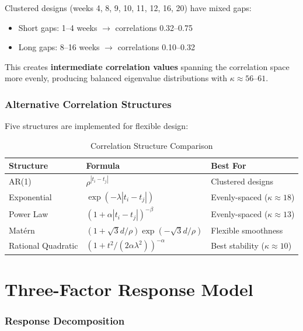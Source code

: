 \documentclass[11pt]{article}
\theoremstyle{definition}
\begin{document}
Clustered designs (weeks 4, 8, 9, 10, 11, 12, 16, 20) have mixed gaps:
\begin{itemize}
    \item Short gaps: 1--4 weeks $\rightarrow$ correlations 0.32--0.75
    \item Long gaps: 8--16 weeks $\rightarrow$ correlations 0.10--0.32
\end{itemize}

This creates \textbf{intermediate correlation values} spanning the correlation
space more evenly, producing balanced eigenvalue distributions with
$\kappa \approx 56$--$61$.

\section{Alternative Correlation Structures}

Five structures are implemented for flexible design:

\begin{table}[h]
\centering
\caption{Correlation Structure Comparison}
\begin{tabular}{@{}lll@{}}
\toprule
\textbf{Structure} & \textbf{Formula} & \textbf{Best For} \\
\midrule
AR(1) & $\rho^{|t_i - t_j|}$ & Clustered designs \\
Exponential & $\exp(-\lambda|t_i - t_j|)$ & Evenly-spaced ($\kappa \approx 18$) \\
Power Law & $(1 + \alpha|t_i - t_j|)^{-\beta}$ & Evenly-spaced ($\kappa \approx 13$) \\
Mat\'ern & $(1 + \sqrt{3}d/\rho)\exp(-\sqrt{3}d/\rho)$ & Flexible smoothness \\
Rational Quadratic & $(1 + t^2/(2\alpha\lambda^2))^{-\alpha}$ & Best stability ($\kappa \approx 10$) \\
\bottomrule
\end{tabular}
\end{table}

\part{Three-Factor Response Model}

\section{Response Decomposition}
\end{document}
